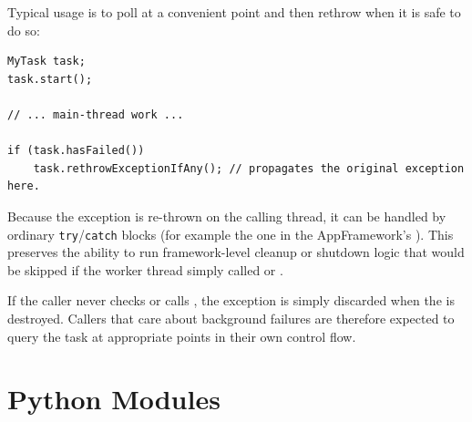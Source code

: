 Typical usage is to poll  at a convenient point and then rethrow when it is safe to do so:
\begin{lstlisting}[style=cppstyle]
MyTask task;
task.start();

// ... main-thread work ...

if (task.hasFailed())
	task.rethrowExceptionIfAny(); // propagates the original exception here.
\end{lstlisting}
Because the exception is re-thrown on the calling thread, it can be handled by ordinary \texttt{try}/\texttt{catch} blocks (for example the one in the AppFramework's ). This preserves the ability to run framework-level cleanup or shutdown logic that would be skipped if the worker thread simply called  or .

If the caller never checks  or calls , the exception is simply discarded when the  is destroyed. Callers that care about background failures are therefore expected to query the task at appropriate points in their own control flow.











\section{Python Modules}\label{section:python_modules}


